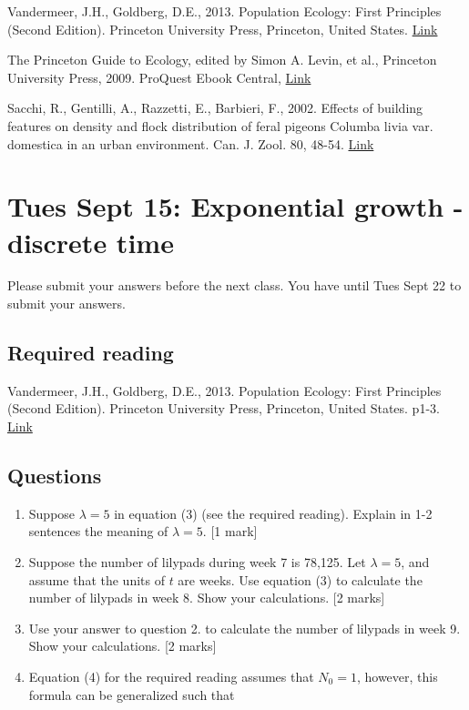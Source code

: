 \documentclass[]{book}
\begin{document}
Vandermeer, J.H., Goldberg, D.E., 2013. Population Ecology: First
Principles (Second Edition). Princeton University Press, Princeton,
United States.
\href{https://ebookcentral-proquest-com.qe2a-proxy.mun.ca/lib/mun/detail.action?docID=1205619}{Link}

The Princeton Guide to Ecology, edited by Simon A. Levin, et al.,
Princeton University Press, 2009. ProQuest Ebook Central,
\href{https://ebookcentral-proquest-com.qe2a-proxy.mun.ca/lib/mun/detail.action?docID=557123}{Link}

Sacchi, R., Gentilli, A., Razzetti, E., Barbieri, F., 2002. Effects of
building features on density and flock distribution of feral pigeons
Columba livia var. domestica in an urban environment. Can. J. Zool. 80,
48-54. \href{https://doi.org/10.1139/z01-202}{Link}

\chapter{Tues Sept 15: Exponential growth - discrete
time}\label{tues-sept-15-exponential-growth---discrete-time}

Please submit your answers before the next class. You have until Tues
Sept 22 to submit your answers.

\section{Required reading}\label{required-reading}

Vandermeer, J.H., Goldberg, D.E., 2013. Population Ecology: First
Principles (Second Edition). Princeton University Press, Princeton,
United States. p1-3.
\href{https://ebookcentral-proquest-com.qe2a-proxy.mun.ca/lib/mun/detail.action?docID=1205619}{Link}

\section{Questions}\label{questions}

\begin{enumerate}
\def\labelenumi{\arabic{enumi}.}
\item
  Suppose \(\lambda = 5\) in equation (3) (see the required reading).
  Explain in 1-2 sentences the meaning of \(\lambda = 5\). {[}1 mark{]}
\item
  Suppose the number of lilypads during week 7 is 78,125. Let
  \(\lambda = 5\), and assume that the units of \(t\) are weeks. Use
  equation (3) to calculate the number of lilypads in week 8. Show your
  calculations. {[}2 marks{]}
\item
  Use your answer to question 2. to calculate the number of lilypads in
  week 9. Show your calculations. {[}2 marks{]}
\item
  Equation (4) for the required reading assumes that \(N_0=1\), however,
  this formula can be generalized such that
\end{enumerate}
\end{document}
